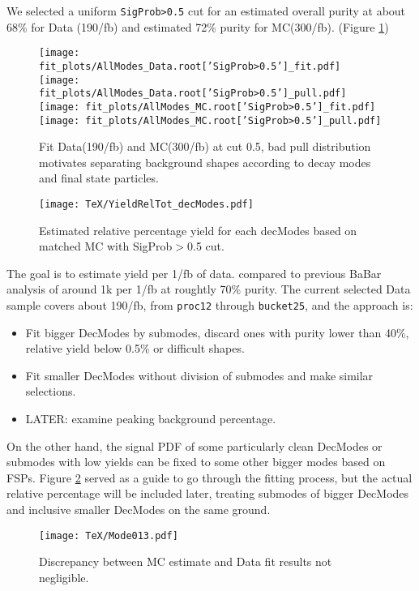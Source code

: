 We selected a uniform \verb+SigProb>0.5+ cut for an estimated overall purity at about 68\% for Data (190/fb)
and estimated 72\% purity for MC(300/fb). (Figure \ref{fig:cut05})
\begin{figure}[h!]
\begin{center}
\texttt{[image: fit\_plots/AllModes\_Data.root['SigProb>0.5']\_fit.pdf]}
\texttt{[image: fit\_plots/AllModes\_Data.root['SigProb>0.5']\_pull.pdf]}
\texttt{[image: fit\_plots/AllModes\_MC.root['SigProb>0.5']\_fit.pdf]}
\texttt{[image: fit\_plots/AllModes\_MC.root['SigProb>0.5']\_pull.pdf]}
\caption{Fit Data(190/fb) and MC(300/fb) at cut 0.5, bad pull distribution motivates separating background shapes according to decay modes and final state particles.}
\label{fig:cut05}
\end{center}
\end{figure}
\begin{figure}[h!]
\begin{center}
\texttt{[image: TeX/YieldRelTot\_decModes.pdf]}
\caption{Estimated relative percentage yield for each decModes based on matched MC with SigProb$>$0.5 cut. }
\label{fig:RelYield}
\end{center}
\end{figure}
The goal is to estimate yield per 1/fb of data. compared to previous BaBar analysis of around 1k per 1/fb at roughtly 70\% purity.
The current selected Data sample covers about 190/fb, from \verb+proc12+ through \verb+bucket25+,
and the approach is:
\begin{itemize}
\item Fit bigger DecModes by submodes, discard ones with purity lower than 40\%, relative yield below 0.5\% or difficult shapes.
\item Fit smaller DecModes without division of submodes and make similar selections.
\item LATER: examine peaking background percentage.
\end{itemize}
On the other hand, the signal PDF of some particularly clean DecModes or submodes with low yields can be fixed to some other bigger modes based on FSPs.
Figure \ref{fig:RelYield} served as a guide to go through the fitting process,  
but the actual relative percentage will be included later, treating submodes of bigger DecModes and inclusive smaller DecModes on the same ground.
\begin{figure}[h!]
\begin{center}
\texttt{[image: TeX/Mode013.pdf]}
\caption{Discrepancy between MC estimate and Data fit results not negligible.}
\label{fig:mode1thru3}
\end{center}
\end{figure}
